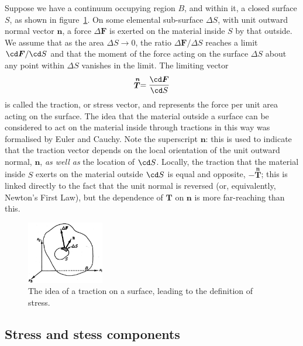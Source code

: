 \documentclass[a4paper,11pt]		{report}
\begin{document}
Suppose we have a continuum occupying region $B$, and within it, a
closed surface $S$, as shown in figure~\ref{fig.tract}. On some
elemental sub-surface $\Delta S$, with unit outward normal vector
$\bm{n}$, a force $\Delta\bm{F}$ is exerted on the material inside $S$
by that outside. We assume that as the area $\Delta S\to0$, the ratio
$\Delta\bm{F}/\Delta S$ reaches a limit $\cd\bm{F}/\cd S$ and that the
moment of the force acting on the surface $\Delta S$ about any point
within $\Delta S$ vanishes in the limit.  The limiting vector 
\begin{equation}
\stackrel{\bm{n}}{\bm{T}}=\frac{\cd\bm{F}}{\cd S}
\end{equation}
is called the traction, or stress vector, and represents the force per
unit area acting on the surface.  The idea that the material outside a
surface can be considered to act on the material inside through
tractions in this way was formalised by Euler and Cauchy.  Note the
superscript $\bm{n}$: this is used to indicate that the traction
vector depends on the local orientation of the unit outward normal,
$\bm{n}$, \emph{as well as} the location of $\cd S$. Locally, the
traction that the material inside $S$ exerts on the material outside
$\cd S$ is equal and opposite, \ie $-\stackrel{\bm{n}}{\bm{T}}$; this
is linked directly to the fact that the unit normal is reversed (or,
equivalently, Newton's First Law), but the dependence of $\bm{T}$ on
$\bm{n}$ is more far-reaching than this.

\begin{figure}
\begin{center}
\includegraphics[width=0.30\textwidth]{Fung-3.1.eps}
\end{center}
\caption{The idea of a traction on a surface, leading to the
  definition of stress. \citep[After][]{fung69}}
\label{fig.tract}
\end{figure}

\subsection{Stress and stess components}
\end{document}
